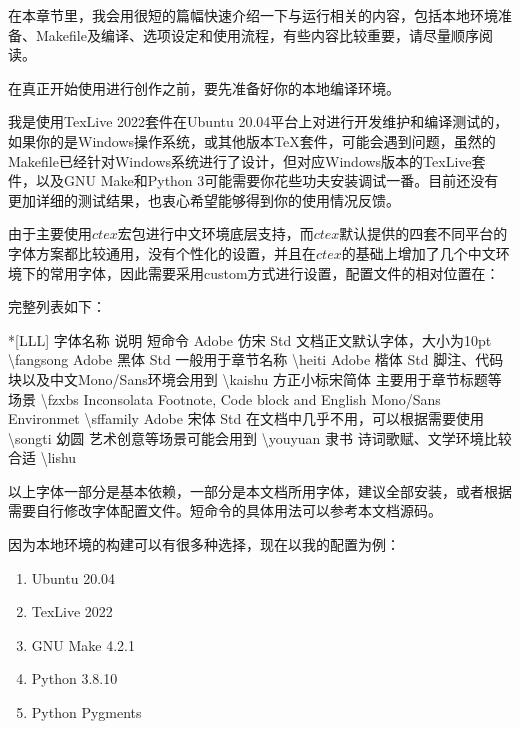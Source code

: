 在本章节里，我会用很短的篇幅快速介绍一下与{\dk}运行相关的内容，包括本地环境准备、Makefile及编译、选项设定和使用流程，有些内容比较重要，请尽量顺序阅读。

在真正开始使用{\dk}进行创作之前，要先准备好你的本地编译环境。

我是使用TexLive 2022套件在Ubuntu 20.04平台上对{\dk}进行开发维护和编译测试的，如果你的是Windows操作系统，或其他版本TeX套件，可能会遇到问题，虽然{\dk}的Makefile已经针对Windows系统进行了设计，但对应Windows版本的TexLive套件，以及GNU Make和Python 3可能需要你花些功夫安装调试一番。目前还没有更加详细的测试结果，也衷心希望能够得到你的使用情况反馈。

由于{\dk}主要使用$ctex$宏包进行中文环境底层支持，而$ctex$默认提供的四套不同平台的字体方案都比较通用，没有个性化的设置，并且{\dk}在$ctex$的基础上增加了几个中文环境下的常用字体，因此需要采用custom方式进行设置，配置文件的相对位置在：

完整列表如下：

\begin{cvhonors}*[LLL]
  \cvhonor
  {\heiti\color{black}字体名称}
  {\heiti\color{black}说明}
  {\heiti\color{black}短命令}
  \cvhonor
  {Adobe 仿宋 Std}
  {文档正文默认字体，大小为10pt}
  {\textbackslash fangsong}
  \cvhonor
  {Adobe 黑体 Std}
  {\heiti 一般用于章节名称}
  {\textbackslash heiti}
  \cvhonor
  {Adobe 楷体 Std}
  {\kaishu 脚注、代码块以及中文Mono/Sans环境会用到}
  {\textbackslash kaishu}
  \cvhonor
  {方正小标宋简体}
  {\fzxbs 主要用于章节标题等场景}
  {\textbackslash fzxbs}
  \cvhonor
  {Inconsolata}
  {\sffamily Footnote, Code block and English Mono/Sans Environmet}
  {\textbackslash sffamily}
  \cvhonor
  {Adobe 宋体 Std}
  {\songti 在文档中几乎不用，可以根据需要使用}
  {\textbackslash songti}
  \cvhonor
  {幼圆}
  {\youyuan 艺术创意等场景可能会用到}
  {\textbackslash youyuan}
  \cvhonor
  {隶书}
  {\lishu 诗词歌赋、文学环境比较合适}
  {\textbackslash lishu}
\end{cvhonors}

以上字体一部分是{\dk}基本依赖，一部分是本文档所用字体，建议全部安装，或者根据需要自行修改字体配置文件。短命令的具体用法可以参考本文档源码。

因为本地环境的构建可以有很多种选择，现在以我的配置为例：

\begin{enumerate}
  \item Ubuntu 20.04
  \item TexLive 2022
  \item GNU Make 4.2.1
  \item Python 3.8.10
  \item Python Pygments
\end{enumerate}

